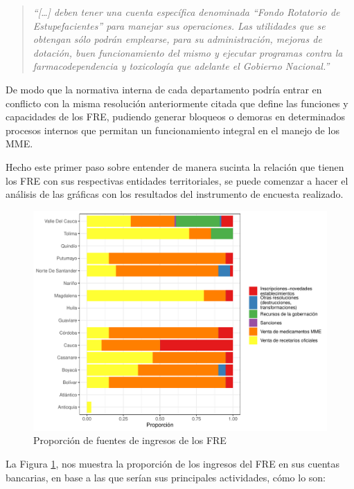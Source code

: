 \documentclass[
]{book}
\begin{document}
\begin{quote}
\emph{``{[}\ldots{]} deben tener una cuenta específica denominada ``Fondo Rotatorio de Estupefacientes'' para manejar sus operaciones. Las utilidades que se obtengan sólo podrán emplearse, para su administración, mejoras de dotación, buen funcionamiento del mismo y ejecutar programas contra la farmacodependencia y toxicología que adelante el Gobierno Nacional.''}
\end{quote}

De modo que la normativa interna de cada departamento podría entrar en conflicto con la misma resolución anteriormente citada que define las funciones y capacidades de los FRE, pudiendo generar bloqueos o demoras en determinados procesos internos que permitan un funcionamiento integral en el manejo de los MME.

Hecho este primer paso sobre entender de manera sucinta la relación que tienen los FRE con sus respectivas entidades territoriales, se puede comenzar a hacer el análisis de las gráficas con los resultados del instrumento de encuesta realizado.

\begin{figure}[t]

{\centering \includegraphics[width=0.85\linewidth]{InformeFinal_files/figure-latex/IngresosFRE1-1} 

}

\caption{Proporción de fuentes de ingresos de los FRE}\label{fig:IngresosFRE1}
\end{figure}

La Figura \ref{fig:IngresosFRE1}, nos muestra la proporción de los ingresos del FRE en sus cuentas bancarias, en base a las que serían sus principales actividades, cómo lo son:
\end{document}
